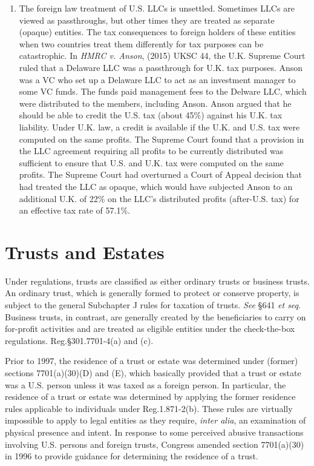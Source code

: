 \begin{enumerate}
	\item 
	The foreign law treatment of U.S. LLCs is unsettled.  Sometimes LLCs are viewed as passthroughs, but other times they are treated as separate (opaque) entities.  The tax consequences to foreign holders of these entities when two countries treat them differently for tax purposes can be catastrophic.  In  \emph{HMRC v. Anson}, (2015) UKSC 44, the U.K. Supreme Court ruled that a Delaware LLC was a passthrough for U.K. tax purposes.   Anson was a VC who set up a Delaware LLC to act as an investment manager to some VC funds.  The funds paid management fees to the Delware LLC, which were distributed to the members, including Anson.  Anson argued that he should be able to credit the U.S. tax (about 45\%) against his U.K. tax liability.  Under U.K. law, a credit is available if the U.K. and U.S. tax were computed on the same profits.  The Supreme Court found that a provision in the LLC agreement requiring all profits to be currently distributed was sufficient to ensure that U.S. and U.K. tax were computed on the same profits.  The Supreme Court had overturned a Court of Appeal decision that had treated the LLC as opaque, which would have subjected Anson to an additional U.K. of 22\% on the LLC's distributed profits (after-U.S. tax) for an effective tax rate of 57.1\%.  
	    
	
	\end{enumerate}


\section{Trusts and Estates}

Under regulations, trusts are classified as either ordinary trusts or business trusts.  An ordinary trust, which is generally formed to protect or conserve property, is subject to the general Subchapter J rules for taxation of trusts.  \emph{See} \S641 \emph{et seq}.  Business trusts, in contrast, are generally created by the beneficiaries to carry on for-profit activities and are treated as eligible entities under the check-the-box regulations. Reg.\@ \S301.7701-4(a) and (c).  

Prior to 1997, the residence of a trust or estate was determined under (former) sections 7701(a)(30)(D) and (E), which basically provided that a trust or estate was a U.S. person unless it was taxed as a foreign person.  In particular, the residence of a trust or estate was determined by applying the former residence rules applicable to individuals under Reg.\@ 1.871-2(b).  These rules are virtually impossible to apply to legal entities as they require, \emph{inter alia}, an examination of physical presence and intent.  In response to some perceived abusive transactions involving U.S. persons and foreign trusts, Congress amended section 7701(a)(30) in 1996 to provide guidance for determining the residence of a trust.

